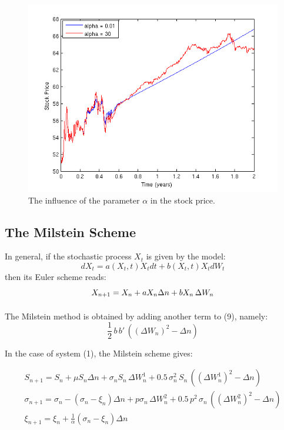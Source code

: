 \documentclass[11pt]{report}
\begin{document}
 \begin{figure}[h]
 \includegraphics{Figures/alpha_effect_S.png}
 \caption{The influence of the parameter $\alpha$ in the stock price.}
\end{figure}
\clearpage
\subsection{The Milstein Scheme}
In general, if the stochastic process $X_t$ is given by the model:
\begin{equation}
dX_t = a(X_t,t)X_t dt + b(X_t,t) X_t dW_t
\end{equation}
then its Euler scheme reads:
\begin{equation}
X_{n+1} = X_n + a X_n \Delta n+ b X_n \, \Delta W_n\\ 
\end{equation}
\paragraph{}
The Milstein method is obtained by adding another term to (9), namely: 
\begin{equation}
\frac{1}{2} \, b \, b' \,((\Delta W_n)^2 - \Delta n)
\end{equation}

In the case of system (1), the Milstein scheme gives:

\begin{eqnarray}
\nonumber
S_{n+1} = S_n +\mu S_n \Delta n+ \sigma_n S_n \, \Delta W_n^1 + 0.5 \, \sigma_n^2 \, S_n \, ( (\Delta W_n^1)^2 - \Delta n) \\
\sigma_{n+1} = \sigma_n - (\sigma_n - \xi_n) \Delta n + p \sigma_n \, \Delta W_n^2 + 0.5 \, p^2 \, \sigma_n \, ( (\Delta W_n^2)^2 - \Delta n)\\
\nonumber
\xi_{n+1} = \xi_n + \frac{1}{\alpha} (\sigma_n - \xi_n) \Delta n
\end{eqnarray}
\end{document}
